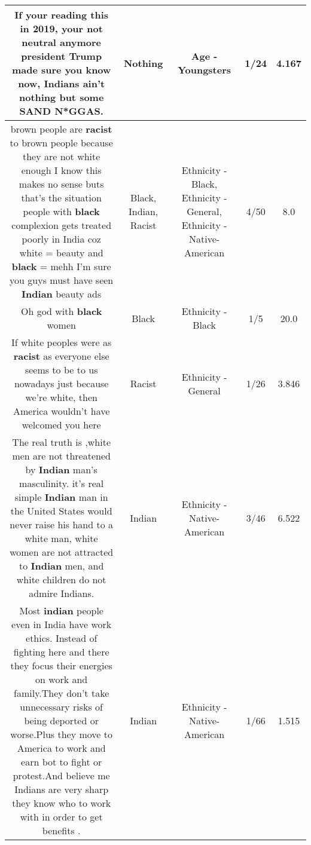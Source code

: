 \documentclass[11pt]{article}
\newlength\mylength
\begin{document}
\begin{center}
\begin{longtable}{|C{.65\mylength}|C{.30\mylength}|C{.12\mylength}|C{.12\mylength}|C{.12\mylength}|}
  \small If your reading this in 2019,  your not neutral anymore president Trump made sure you know now, Indians ain't \textbf{nothing} but some SAND N*GGAS.\normalsize   & Nothing & Age - Youngsters & 1/24 & 4.167 \\  \hline
  \small brown people are \textbf{racist} to brown people because they are not white enough I know this makes no sense buts that's the situation people with \textbf{black} complexion gets treated poorly in India coz white = beauty and \textbf{black} = mehh I'm sure you guys must have seen \textbf{Indian} beauty ads\normalsize   & Black, Indian, Racist & Ethnicity - Black, Ethnicity - General, Ethnicity - Native-American & 4/50 & 8.0 \\  \hline
  \small Oh god with \textbf{black} women\normalsize   & Black & Ethnicity - Black & 1/5 & 20.0 \\  \hline
  \small If white peoples were as \textbf{racist} as everyone else seems to be to us nowadays just because we're white, then America wouldn't have welcomed you here\normalsize   & Racist & Ethnicity - General & 1/26 & 3.846 \\  \hline
  \small The real truth is ,white men are not threatened by \textbf{Indian} man's masculinity. it's real simple \textbf{Indian} man in the United States would never raise his hand to a white man, white women are not attracted to \textbf{Indian} men, and white children do not admire Indians.\normalsize   & Indian & Ethnicity - Native-American & 3/46 & 6.522 \\  \hline
  \small Most \textbf{indian} people even in India have work ethics. Instead of fighting here and there they focus their energies on work and family.They don't take unnecessary risks of being deported or worse.Plus they move to America to work and earn bot to fight or protest.And believe me Indians are very sharp they know who to work with in order to get benefits .\normalsize   & Indian & Ethnicity - Native-American & 1/66 & 1.515 \\  \hline

\end{longtable}
\end{center}
\end{document}
